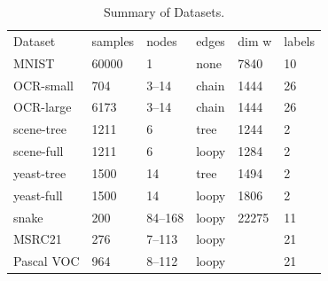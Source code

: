 \begin{table}
    \caption{Summary of Datasets.}
    \begin{tabu} to 
    \toprule
    Dataset    & {samples} & nodes & edges & {dim w} & {labels}\\
    MNIST      & 60000   & 1     & none  & 7840  & 10\\
    OCR-small  & 704     & 3--14 & chain & 1444  & 26\\
    OCR-large  & 6173    & 3--14 & chain & 1444  & 26\\
    scene-tree & 1211    & 6     & tree  & 1244  & 2\\
    scene-full & 1211    & 6     & loopy & 1284  & 2\\
    yeast-tree & 1500    & 14    & tree  & 1494  & 2\\
    yeast-full & 1500    & 14    & loopy & 1806  & 2\\
    snake      & 200     &84--168& loopy & 22275 & 11\\
    MSRC21     & 276     & 7--113& loopy &       & 21\\
    Pascal VOC & 964     & 8--112& loopy &       & 21\\
    \bottomrule

    \end{tabu}
\end{table}


